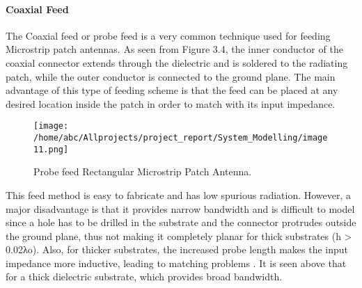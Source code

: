 \documentclass[12pt]{article}
\begin{document}
					               \paragraph{ Coaxial Feed}
					                \justify
					                
					                
					                  The Coaxial feed or probe feed is a very common technique used for feeding Microstrip patch antennas. As seen from Figure 3.4, the inner conductor of the coaxial connector extends through the dielectric and is soldered to the radiating patch, while the outer conductor is connected to the ground plane. The main advantage of this type of feeding scheme is that the feed can be placed at any desired location inside the patch in order to match with its input impedance.
					                     \begin{figure}[H]
					                     	\centering
					                     	\texttt{[image: /home/abc/Allprojects/project\_report/System\_Modelling/image11.png]}
					                     	\caption{Probe feed Rectangular Microstrip Patch Antenna. }	             	
					                     \end{figure}
					                   This feed method is easy to fabricate and has low spurious radiation. However, a major disadvantage is that it provides narrow bandwidth and is difficult to model since a hole has to be drilled in the substrate and the connector protrudes outside the ground plane, thus not making it completely planar for thick substrates (h > 0.02λo). Also, for thicker substrates, the increased probe length makes the input impedance more inductive, leading to matching problems . It is seen above that for a thick dielectric substrate, which provides broad bandwidth.
\end{document}
